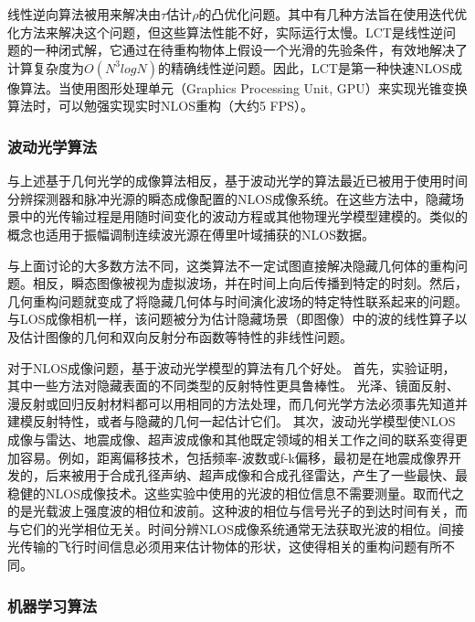 \documentclass[master]{shtthesis}             %
\begin{document}
线性逆向算法被用来解决由$\tau$估计$\rho$的凸优化问题。其中有几种方法旨在使用迭代优化方法来解决这个问题\citep{gupta2012reconstruction,wu2012frequency,heide2014diffuse}，但这些算法性能不好，实际运行太慢。LCT\citep{Otoole2018}是线性逆问题的一种闭式解，它通过在待重构物体上假设一个光滑的先验条件，有效地解决了计算复杂度为$O(N^3logN)$的精确线性逆问题。因此，LCT是第一种快速NLOS成像算法。当使用图形处理单元（Graphics Processing Unit, GPU）来实现光锥变换算法时，可以勉强实现实时NLOS重构（大约5 FPS）\citep{DBLP:journals/corr/abs-2010-12737}。

\subsubsection{波动光学算法}

与上述基于几何光学的成像算法相反，基于波动光学的算法最近已被用于使用时间分辨探测器和脉冲光源的瞬态成像配置的NLOS成像系统\citep{Liu2019,DavidB.Lindell2019,Teichman2019,Elten2019,Dove2019}。在这些方法中，隐藏场景中的光传输过程是用随时间变化的波动方程或其他物理光学模型建模的。类似的概念也适用于振幅调制连续波光源在傅里叶域捕获的NLOS数据\citep{kadambi2013coded}。

与上面讨论的大多数方法不同，这类算法不一定试图直接解决隐藏几何体的重构问题。相反，瞬态图像被视为虚拟波场，并在时间上向后传播到特定的时刻。然后，几何重构问题就变成了将隐藏几何体与时间演化波场的特定特性联系起来的问题。与LOS成像相机一样，该问题被分为估计隐藏场景（即图像）中的波的线性算子以及估计图像的几何和双向反射分布函数等特性的非线性问题。

对于NLOS成像问题，基于波动光学模型的算法有几个好处。
首先，实验证明，其中一些方法对隐藏表面的不同类型的反射特性更具鲁棒性。
光泽、镜面反射、漫反射或回归反射材料都可以用相同的方法处理，而几何光学方法必须事先知道并建模反射特性，或者与隐藏的几何一起估计它们。
其次，波动光学模型使NLOS成像与雷达、地震成像、超声波成像和其他既定领域的相关工作之间的联系变得更加容易。例如，距离偏移技术，包括频率-波数或f-k偏移，最初是在地震成像界开发的\citep{stolt1978migration}，后来被用于合成孔径声纳\citep{callow2003signal,sheriff1992synthetic}、超声成像\citep{sheriff1992synthetic}和合成孔径雷达\citep{sheriff1992synthetic}，产生了一些最快、最稳健的NLOS成像技术\citep{DavidB.Lindell2019}。这些实验中使用的光波的相位信息不需要测量。取而代之的是光载波上强度波的相位和波前。这种波的相位与信号光子的到达时间有关，而与它们的光学相位无关。时间分辨NLOS成像系统通常无法获取光波的相位。间接光传输的飞行时间信息必须用来估计物体的形状，这使得相关的重构问题有所不同。

\subsubsection{机器学习算法}
\end{document}
